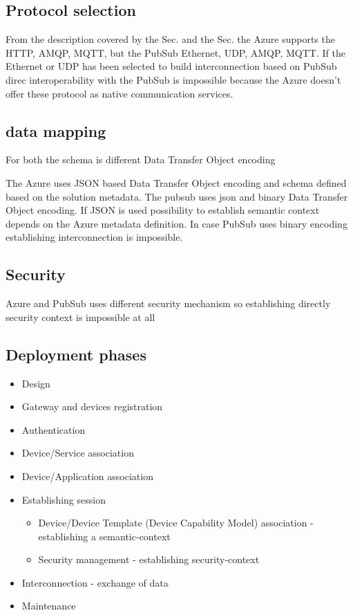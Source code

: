 \documentclass[
]{article}
\providecommand{\tightlist}{%
  \setlength{\itemsep}{0pt}\setlength{\parskip}{0pt}}
\begin{document}
\hypertarget{protocol-selection}{%
\subsection{Protocol selection}\label{protocol-selection}}

From the description covered by the Sec. and the Sec. the Azure supports the HTTP, AMQP, MQTT, but the PubSub Ethernet, UDP, AMQP, MQTT. If the Ethernet or UDP has been selected to build interconnection based on PubSub direc interoperability with the PubSub is impossible because the Azure doesn't offer these protocol as native communication services.

\hypertarget{data-mapping}{%
\subsection{data mapping}\label{data-mapping}}

For both the schema is different Data Transfer Object encoding

The Azure uses JSON based Data Transfer Object encoding and schema defined based on the solution metadata. The pubsub uses json and binary Data Transfer Object encoding. If JSON is used possibility to establish semantic context depends on the Azure metadata definition. In case PubSub uses binary encoding establishing interconnection is impossible.

\hypertarget{security}{%
\subsection{Security}\label{security}}

Azure and PubSub uses different security mechanism so establishing directly security context is impossible at all

\hypertarget{deployment-phases}{%
\subsection{Deployment phases}\label{deployment-phases}}

\begin{itemize}
\tightlist
\item
  Design
\item
  Gateway and devices registration
\item
  Authentication
\item
  Device/Service association
\item
  Device/Application association
\item
  Establishing session

  \begin{itemize}
  \tightlist
  \item
    Device/Device Template (Device Capability Model) association - establishing a semantic-context
  \item
    Security management - establishing security-context
  \end{itemize}
\item
  Interconnection - exchange of data
\item
  Maintenance
\end{itemize}
\end{document}
